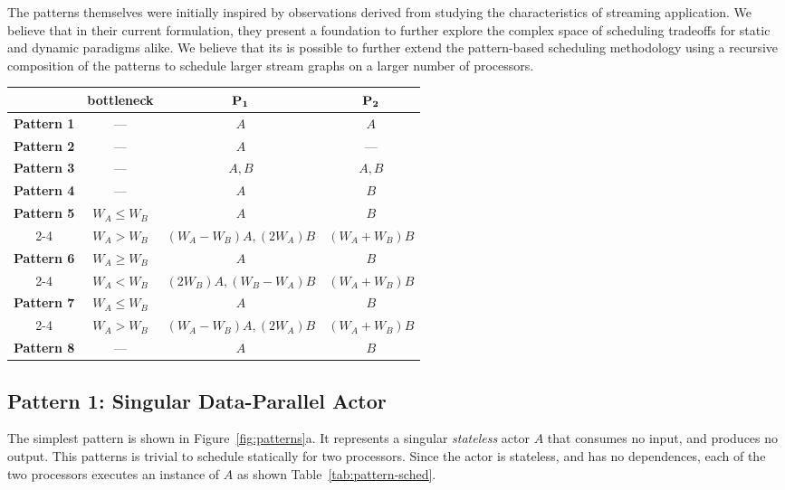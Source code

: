 The patterns themselves were initially inspired by observations
derived from studying the characteristics of streaming application. We
believe that in their current formulation, they present a foundation
to further explore the complex space of scheduling tradeoffs for
static and dynamic paradigms alike.  We believe that its is possible
to further extend the pattern-based scheduling methodology using a
recursive composition of the patterns to schedule larger stream graphs
on a larger number of processors.

\begin{table*}[t]
\center
\caption{\small Maximum efficiency static schedules for the stream graph patterns.}
{\small
\begin{tabular}{|c|c|c|c|} \hline
                 & {\bf bottleneck} & ${\bf P_1}$  & ${\bf P_2}$ \\ \hline
{\bf Pattern 1}  & ---              & $A$     & $A$ \\ \hline
{\bf Pattern 2}  & ---              & $A$     & --- \\ \hline
{\bf Pattern 3}  & ---              & $A, B$  & $A, B$ \\ \hline
{\bf Pattern 4}  & ---              & $A$     & $B$ \\ \hline
{\bf Pattern 5}  & $W_A \le W_B$    & $A$     & $B$ \\ \cline{2-4}
                 & $W_A > W_B$      & $(W_A - W_B) A, (2W_A) B$ & $(W_A + W_B) B$ \\ \hline
{\bf Pattern 6}  & $W_A \ge W_B$    & $A$     & $B$ \\ \cline{2-4}
                 & $W_A < W_B$      & $(2W_B) A, (W_B - W_A) B$ & $(W_A + W_B) B$ \\ \hline
{\bf Pattern 7}  & $W_A \le W_B$    & $A$     & $B$ \\ \cline{2-4}
                 & $W_A > W_B$      & $(W_A - W_B) A, (2W_A) B$ & $(W_A + W_B) B$ \\ \hline
{\bf Pattern 8}  & ---              & $A$     & $B$ \\ \hline
\end{tabular}}
\label{tab:pattern-sched}
\end{table*}


\subsection{Pattern 1: Singular Data-Parallel Actor}

The simplest pattern is shown in Figure~\ref{fig:patterns}a. It
represents a singular {\it stateless} actor $A$ that consumes no
input, and produces no output.
This patterns is trivial to schedule statically for two
processors. Since the actor is stateless, and has no dependences, each
of the two processors executes an instance of $A$ as shown Table~\ref{tab:pattern-sched}.

